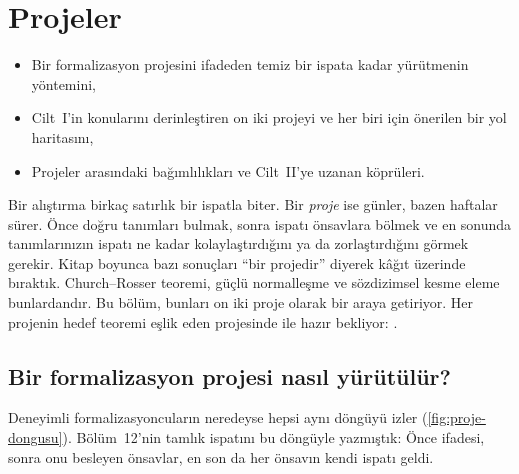 \chapter{Projeler}\label{bol:proje}

\begin{bolumhedefleri}
\begin{itemize}
  \item Bir formalizasyon projesini ifadeden temiz bir ispata kadar
        yürütmenin yöntemini,
  \item Cilt~I'in konularını derinleştiren on iki projeyi ve her biri için
        önerilen bir yol haritasını,
  \item Projeler arasındaki bağımlılıkları ve Cilt~II'ye uzanan köprüleri.
\end{itemize}
\end{bolumhedefleri}

Bir alıştırma birkaç satırlık bir ispatla biter. Bir \emph{proje} ise
günler, bazen haftalar sürer. Önce doğru tanımları bulmak, sonra ispatı
önsavlara bölmek ve en sonunda tanımlarınızın ispatı ne kadar
kolaylaştırdığını ya da zorlaştırdığını görmek gerekir. Kitap boyunca bazı
sonuçları ``bir projedir'' diyerek kâğıt üzerinde bıraktık. Church--Rosser
teoremi, güçlü normalleşme ve sözdizimsel kesme eleme bunlardandır. Bu
bölüm, bunları on iki proje olarak bir araya getiriyor. Her projenin hedef
teoremi eşlik eden \Lean{} projesinde  ile hazır bekliyor:
\allowbreak{}\allowbreak{}.

\section{Bir formalizasyon projesi nasıl yürütülür?}\label{sec:proje-yontem}

Deneyimli formalizasyoncuların neredeyse hepsi aynı döngüyü izler
(\cref{fig:proje-dongusu}). Bölüm~12'nin tamlık ispatını bu döngüyle
yazmıştık: Önce  ifadesi, sonra onu besleyen önsavlar, en son
da her önsavın kendi ispatı geldi.

